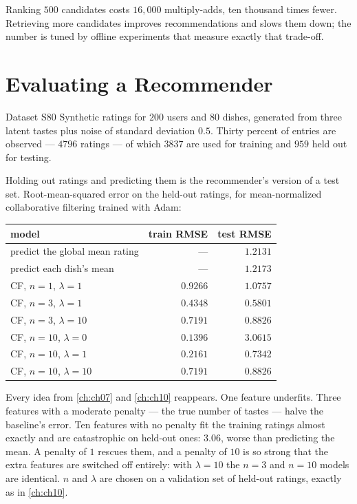 Ranking $500$ candidates costs $16{,}000$ multiply-adds, ten thousand times fewer.
Retrieving more candidates improves recommendations and slows them down; the
number is tuned by offline experiments that measure exactly that trade-off.

\section{Evaluating a Recommender}
\label{sec:rec-eval}

\begin{defbox}{Dataset S80}
Synthetic ratings for $200$ users and $80$ dishes, generated from three latent
tastes plus noise of standard deviation $0.5$. Thirty percent of entries are
observed --- $4796$ ratings --- of which $3837$ are used for training and $959$
held out for testing.
\end{defbox}

Holding out ratings and predicting them is the recommender's version of a test
set. Root-mean-squared error on the held-out ratings, for mean-normalized
collaborative filtering trained with Adam:

\begin{center}
\small
\renewcommand{\arraystretch}{1.15}
\begin{tabular}{@{}lrr@{}}
\toprule
model & train RMSE & test RMSE\\
\midrule
predict the global mean rating         & ---      & $1.2131$\\
predict each dish's mean               & ---      & $1.2173$\\
CF, $n = 1$, $\lambda = 1$             & $0.9266$ & $1.0757$\\
CF, $n = 3$, $\lambda = 1$             & $0.4348$ & $\mathbf{0.5801}$\\
CF, $n = 3$, $\lambda = 10$            & $0.7191$ & $0.8826$\\
CF, $n = 10$, $\lambda = 0$            & $0.1396$ & $3.0615$\\
CF, $n = 10$, $\lambda = 1$            & $0.2161$ & $0.7342$\\
CF, $n = 10$, $\lambda = 10$           & $0.7191$ & $0.8826$\\
\bottomrule
\end{tabular}
\end{center}

Every idea from \cref{ch:ch07} and \cref{ch:ch10} reappears. One feature
underfits. Three features with a moderate penalty --- the true number of tastes
--- halve the baseline's error. Ten features with no penalty fit the training
ratings almost exactly and are catastrophic on held-out ones: $3.06$, worse than
predicting the mean. A penalty of $1$ rescues them, and a penalty of $10$ is so
strong that the extra features are switched off entirely: with $\lambda = 10$ the
$n = 3$ and $n = 10$ models are identical. $n$ and $\lambda$ are chosen on a
validation set of held-out ratings, exactly as in \cref{ch:ch10}.

